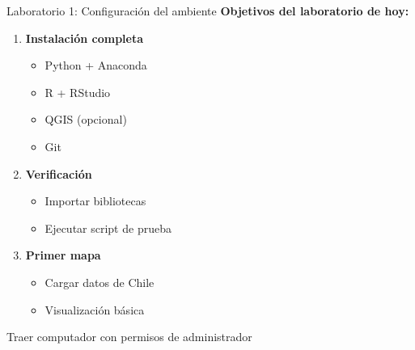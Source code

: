 \documentclass[10pt]{beamer}
\newcommand{\examplebox}[2]{
\begin{tcolorbox}[colframe=usachblue,colback=white,title=#1,fonttitle=\small,fontlower=\small]
#2
\end{tcolorbox}
}
\begin{document}
\begin{frame}{Laboratorio 1: Configuración del ambiente}
    \textbf{Objetivos del laboratorio de hoy:}
    
    \begin{enumerate}
        \item \textcolor{blue}{} \textbf{Instalación completa}
        \begin{itemize}
            \item Python + Anaconda
            \item R + RStudio
            \item QGIS (opcional)
            \item Git
        \end{itemize}
        
        \item \textcolor{green}{} \textbf{Verificación}
        \begin{itemize}
            \item Importar bibliotecas
            \item Ejecutar script de prueba
        \end{itemize}
        
        \item \textcolor{orange}{} \textbf{Primer mapa}
        \begin{itemize}
            \item Cargar datos de Chile
            \item Visualización básica
        \end{itemize}
    \end{enumerate}
    
    \vspace{0.3cm}
    \examplebox{Importante:}{
        Traer computador con permisos de administrador
    }
\end{frame}
\end{document}

